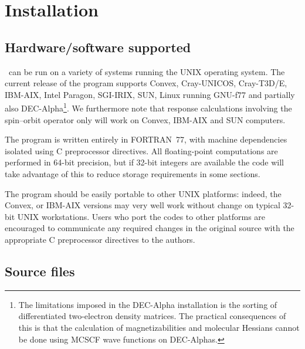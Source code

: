 \chapter{Installation}\label{ch:install}

\section{Hardware/software
supported}\label{sec:hardsoft}

          \siraba\ can be run on a variety of systems running the UNIX
operating system.  The current
release of the program supports
Convex, Cray-UNICOS,
Cray-T3D/E,
IBM-AIX, Intel Paragon,
SGI-IRIX, SUN,
Linux running GNU-f77 and partially also
DEC-Alpha\footnote{The limitations imposed in the
DEC-Alpha installation is the sorting of differentiated two-electron
density matrices. The practical consequences of this is that the
calculation of magnetizabilities and molecular
Hessians cannot be done
using MCSCF wave functions on DEC-Alphas.}. We
furthermore note that
response calculations involving the spin--orbit
operator only will  work on Convex, IBM-AIX and SUN computers.

          The program is written entirely in
FORTRAN~77, with
machine dependencies isolated using C preprocessor directives.  All floating-point computations are
performed in 64-bit precision, but if 32-bit integers are
available the code will take advantage of this to reduce storage
requirements in some sections.

          The program should be easily portable to other UNIX
platforms: indeed, the Convex, or
IBM-AIX versions
may very well work without change on typical 32-bit UNIX workstations.
Users who port the codes to other platforms are encouraged to
communicate any required changes in the original source with the
appropriate C preprocessor directives to the authors.

\section{Source files}\label{sec:source}

